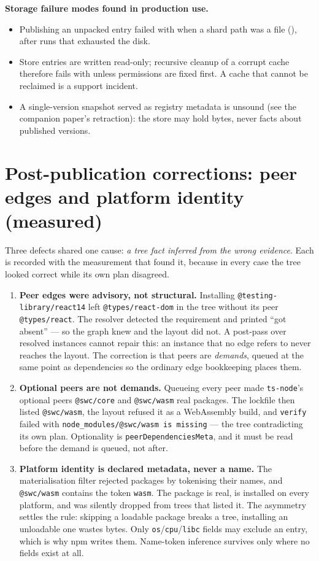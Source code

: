 \documentclass[
  11pt,
  letterpaper,
]{article}
\begin{document}
\textbf{Storage failure modes found in production use.}
\begin{itemize}
\item Publishing an unpacked entry failed with  when a shard path was a file
  (), after runs that exhausted the disk.
\item Store entries are written read-only; recursive cleanup of a corrupt cache therefore fails
  with  unless permissions are fixed first. A cache that cannot be reclaimed is a
  support incident.
\item A single-version snapshot served as registry metadata is unsound (see the companion paper's
  retraction): the store may hold bytes, never facts about published versions.
\end{itemize}


\section{Post-publication corrections: peer edges and platform identity (measured)}

Three defects shared one cause: \emph{a tree fact inferred from the wrong evidence}. Each is recorded
with the measurement that found it, because in every case the tree looked correct while its own plan
disagreed.

\begin{enumerate}
\item \textbf{Peer edges were advisory, not structural.} Installing \texttt{@testing-library/react\@14}
left \texttt{@types/react-dom} in the tree without its peer \texttt{@types/react}. The resolver
detected the requirement and printed ``got absent'' --- so the graph knew and the layout did not. A
post-pass over resolved instances cannot repair this: an instance that no edge refers to never
reaches the layout. The correction is that peers are \emph{demands}, queued at the same point as
dependencies so the ordinary edge bookkeeping places them.
\item \textbf{Optional peers are not demands.} Queueing every peer made \texttt{ts-node}'s optional
peers \texttt{@swc/core} and \texttt{@swc/wasm} real packages. The lockfile then listed
\texttt{@swc/wasm}, the layout refused it as a WebAssembly build, and \texttt{verify} failed with
\texttt{node_modules/@swc/wasm is missing} --- the tree contradicting its own plan. Optionality is
\texttt{peerDependenciesMeta}, and it must be read before the demand is queued, not after.
\item \textbf{Platform identity is declared metadata, never a name.} The materialisation filter
rejected packages by tokenising their names, and \texttt{@swc/wasm} contains the token \texttt{wasm}.
The package is real, is installed on every platform, and was silently dropped from trees that listed
it. The asymmetry settles the rule: skipping a loadable package breaks a tree, installing an
unloadable one wastes bytes. Only \texttt{os}/\texttt{cpu}/\texttt{libc} fields may exclude an entry,
which is why npm writes them. Name-token inference survives only where no fields exist at all.
\end{enumerate}
\end{document}
